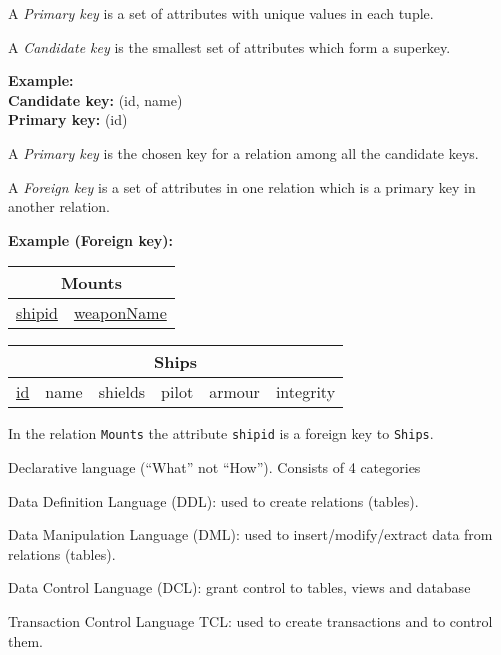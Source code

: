 \documentclass{beamer}
\begin{document}
\begin{slide}{
\item A \textit{Primary key} is a set of attributes with unique values in each tuple.
\item A \textit{Candidate key} is the smallest set of attributes which form a superkey.

\vspace{0.5cm}
\textbf{Example:}\\
\textbf{Candidate key:} (id, name) \\
\textbf{Primary key:} (id)
}\end{slide}

\begin{slide}{
\item A \textit{Primary key} is the chosen key for a relation among all the candidate keys.
\item A \textit{Foreign key} is a set of attributes in one relation which is a primary key in another relation.

\vspace{0.5cm}
\textbf{Example (Foreign key):}\\

\centering
\begin{tabular}{|c|c|}
\hline
\multicolumn{2}{|c|}{\textbf{Mounts}} \\
\hline
\underline{shipid} & \underline{weaponName} \\
\hline
\end{tabular}

\vspace{0.2cm}
\begin{tabular}{|c|c|c|c|c|c|}
\hline
\multicolumn{6}{|c|}{\textbf{Ships}} \\
\hline
\underline{id} & name & shields & pilot  & armour & integrity \\
\hline
\end{tabular}

\raggedright
\vspace{0.2cm}
In the relation \texttt{Mounts} the attribute \texttt{shipid} is a foreign key to \texttt{Ships}.


}\end{slide}

\begin{slide}{
\item Declarative language (``What'' not ``How''). Consists of 4 categories
\pause
\item Data Definition Language (DDL): used to create relations (tables).
\item Data Manipulation Language (DML): used to insert/modify/extract data from relations (tables).
\item Data Control Language (DCL): grant control to tables, views and database
\item Transaction Control Language TCL:  used to create transactions and to control them. 
}\end{slide}
\end{document}
